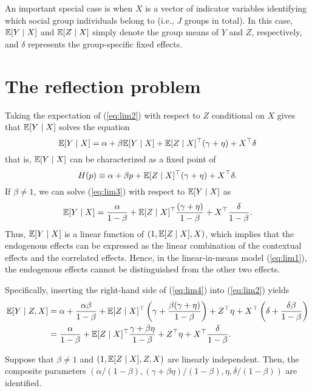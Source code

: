 \documentclass[11pt, A4paper, openany, uplatex]{book}
\begin{document}
An important special case is when $X$ is a vector of indicator variables identifying which social group individuals belong to (i.e., $J$ groups in total). In this case, $\mathbb{E}[Y \mid X]$ and $\mathbb{E}[Z \mid X]$ simply denote the group means of $Y$ and $Z$, respectively, and $\delta$ represents the group-specific fixed effects.

\section{The reflection problem}

Taking the expectation of (\ref{eq:lim2}) with respect to $Z$ conditional on $X$ gives that $\mathbb{E}[Y \mid X]$ solves the  equation
\begin{equation}\label{eq:lim3}
	\mathbb{E}[Y \mid X] = \alpha + \beta \mathbb{E}[Y \mid X] + \mathbb{E}[Z \mid X]^\top (\gamma + \eta) + X^\top \delta 
\end{equation}
that is, $\mathbb{E}[Y \mid X]$ can be characterized as a fixed point of
\[
	H(p) \equiv \alpha + \beta p + \mathbb{E}[Z \mid X]^\top (\gamma + \eta) + X^\top \delta .
\]
If $\beta \neq 1$, we can solve (\ref{eq:lim3}) with respect to $\mathbb{E}[Y \mid X]$ as
\begin{equation}\label{eq:lim4}
	\mathbb{E}[Y \mid X] = \frac{\alpha}{1 -\beta} + \mathbb{E}[Z \mid X]^\top \frac{ (\gamma + \eta)}{1 - \beta} + X^\top \frac{\delta}{1 - \beta}. 
\end{equation}
Thus, $\mathbb{E}[Y \mid X]$ is a linear function of $(1, \mathbb{E}[Z \mid X], X)$, which implies that the endogenous effects can be expressed as the linear combination of the contextual effects and the correlated effects. Hence, in the linear-in-means model (\ref{eq:lim1}), the endogenous effects cannot be distinguished from the other two effects.

Specifically, inserting the right-hand side of (\ref{eq:lim4}) into (\ref{eq:lim2}) yields
\begin{align*}
	\mathbb{E}[Y \mid Z, X] 
	&= \alpha + \frac{\alpha \beta}{1 -\beta} + \mathbb{E}[Z \mid  X]^\top \left( \gamma +  \frac{\beta (\gamma + \eta)}{1 - \beta}\right) + Z^\top \eta  + X^\top \left( \delta + \frac{\delta \beta}{1 - \beta}\right)\\
	&= \frac{\alpha}{1 -\beta} + \mathbb{E}[Z \mid  X]^\top\frac{\gamma + \beta \eta}{1 - \beta} + Z^\top \eta + X^\top\frac{\delta}{1 - \beta}.
\end{align*}

\begin{theorem}\label{thm:reflection}
Suppose that $\beta \neq 1$ and $(1, \mathbb{E}[Z \mid X], Z, X)$ are linearly independent.
Then, the composite parameters $(\alpha/(1 -\beta), (\gamma + \beta \eta)/(1 - \beta), \eta, \delta/(1 - \beta))$ are identified.
\end{theorem}
\end{document}
